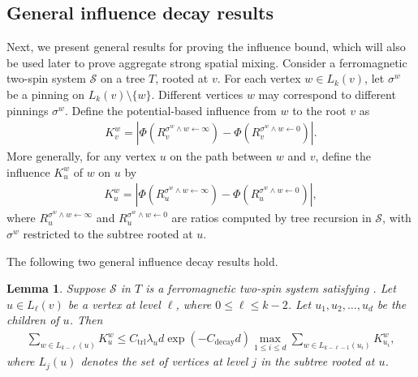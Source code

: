 \documentclass[11pt]{amsart}
\newcommand{\tp}[1]{{\left( #1 \right)}}
\def\+#1{\mathcal{#1}}
\newcommand{\abs}[1]{\ensuremath{\left\vert#1\right\vert}}
\newtheorem{lemma}[theorem]{Lemma}
\theoremstyle{definition}
\theoremstyle{remark}
\begin{document}
\subsection{General influence decay results}\label{subsec:general-results-for-correlation-decay}
Next, we present general results for proving the influence bound, which will also be used later to prove aggregate strong spatial mixing. Consider a ferromagnetic two-spin system $\+S$ on a tree $T$, rooted at $v$. For each vertex $w \in L_k(v)$, let $\sigma^w$ be a pinning on $L_k(v) \setminus \{w\}$. Different vertices $w$ may correspond to different pinnings $\sigma^w$. Define the potential-based influence from $w$ to the root $v$ as
\begin{align}\label{eq:K-v-w-potential}
    K_v^w = \abs{\Phi(R_v^{\sigma^w \land w \gets \infty}) - \Phi(R_v^{\sigma^w \land w \gets 0})}.
\end{align}
More generally, for any vertex $u$ on the path between $w$ and $v$, define the influence $K_u^w$ of $w$ on $u$ by
\begin{align}\label{eq:K-u-w-potential}
K_u^w = \abs{\Phi(R_u^{\sigma^w \land w \gets \infty}) - \Phi(R_u^{\sigma^w \land w \gets 0})},
\end{align}
where $R_u^{\sigma^w \land w \gets \infty}$ and $R_u^{\sigma^w \land w \gets 0}$ are ratios computed by tree recursion in $\+S$, with $\sigma^w$ restricted to the subtree rooted at $u$.

The following two general influence decay results hold. 
\begin{lemma}\label{lemma:general-influence-decay-1}
    Suppose $\+S$ in $T$ is a ferromagnetic two-spin system satisfying .
    Let $u \in L_\ell(v)$ be a vertex at level $\ell$, where $0 \le \ell \leq k-2$. Let $u_1,u_2,\ldots,u_d$ be the children of $u$. Then
\begin{align*}
\sum_{w \in L_{k-\ell}(u)} K_u^w %
 \leq C_\text{trl} \lambda_u d \exp(-C_{\text{decay}}d)\max_{1 \leq i \leq d} \sum_{w \in L_{k-\ell-1}(u_i)} K_{u_i}^w,
\end{align*}
where $L_j(u)$ denotes the set of vertices at level $j$ in the subtree rooted at $u$.
\end{lemma}



\end{document}
